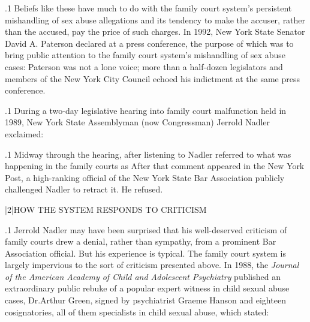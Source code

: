 \documentclass[11pt, twoside]{article}
\begin{document}
{\p.1{%
\:Beliefs like these have much to do with the family court system’s persistent mishandling of sex abuse allegations and its tendency to make
the accuser, rather than the accused, pay the price of such charges. In
1992, New York State Senator David A. Paterson declared at a press conference, the purpose of which was to bring public attention to the family
court system’s mishandling of sex abuse cases:  Paterson was not a lone voice; more than a half-dozen legislators and members of the New York City Council echoed his indictment
at the same press conference.\;
}%

\p.1{%
\:During a two-day legislative hearing into family court malfunction
held in 1989, New York State Assemblyman (now Congressman) Jerrold
Nadler exclaimed: \;
}%

\p.1{%
\:Midway through the hearing, after listening to 
Nadler referred to what was happening in the family courts as  After that comment appeared in the New
York Post, a high-ranking official of the New York State Bar Association
publicly challenged Nadler to retract it. He refused.\;
}%


\s|2|{HOW THE SYSTEM RESPONDS TO CRITICISM}

\p.1{%
\noindent{}\:Jerrold Nadler may have been surprised that his well-deserved criticism of family courts drew a denial, rather than sympathy, from a prominent Bar
Association official. But his experience is typical. The family court system is largely impervious to the sort of criticism presented above.
In 1988, the \textit{Journal of the American Academy of Child and Adolescent
Psychiatry} published an extraordinary public rebuke of a popular expert
witness in child sexual abuse cases, Dr.\@ Arthur Green, signed by psychiatrist Graeme Hanson and eighteen cosignatories, all of them specialists
in child sexual abuse, which stated: \;
}%

}
\end{document}
